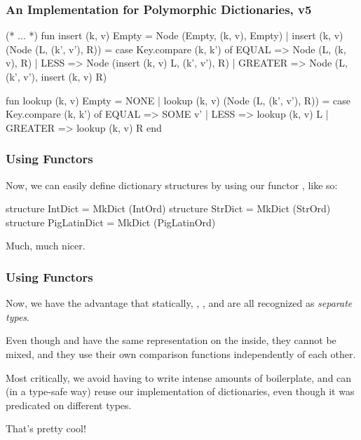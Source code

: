 \documentclass[aspectratio=169]{beamer}
\begin{document}
\begin{frame}[fragile]
  \frametitle{An Implementation for Polymorphic Dictionaries, v5}

  {\small
  \begin{codeblock}
    (* ... *)
      fun insert (k, v) Empty = Node (Empty, (k, v), Empty)
        | insert (k, v) (Node (L, (k', v'), R)) =
            case Key.compare (k, k') of
              EQUAL   => Node (L, (k, v), R)
            | LESS    => Node (insert (k, v) L, (k', v'), R)
            | GREATER => Node (L, (k', v'), insert (k, v) R)

      fun lookup (k, v) Empty = NONE
        | lookup (k, v) (Node (L, (k', v'), R)) =
            case Key.compare (k, k') of
              EQUAL   => SOME v'
            | LESS    => lookup (k, v) L
            | GREATER => lookup (k, v) R
    end
  \end{codeblock}
  }

\end{frame}

\begin{frame}[fragile]
  \frametitle{Using Functors}

  Now, we can easily define dictionary structures by using our functor
  , like so:
  \pause

  \begin{codeblock}
    structure IntDict      = MkDict (IntOrd)
    structure StrDict      = MkDict (StrOrd)
    structure PigLatinDict = MkDict (PigLatinOrd)
  \end{codeblock}

  \pause
  \vspace{\fill}

  Much, much nicer.
\end{frame}

\begin{frame}[fragile]
  \frametitle{Using Functors}

  Now, we have the advantage that statically, ,
  , and  are all recognized as
  \textit{separate types}.

  \pause
  \vspace{\fill}

  Even though  and  have the same
  representation on the inside, they cannot be mixed, and they use
  their own comparison functions independently of each other.

  \pause
  \vspace{\fill}

  Most critically, we avoid having to write intense amounts of boilerplate,
  and can (in a type-safe way) reuse our implementation of dictionaries,
  even though it was predicated on different types.

  \vspace{\fill}

  That's pretty cool!


\end{frame}
\end{document}
